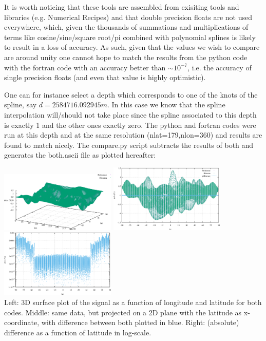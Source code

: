 It is worth noticing that these tools are assembled from exisiting tools and libraries (e.g. 
Numerical Recipes) and that double precision floats are not used everywhere, which, given the
thousands of summations and multiplications of terms like cosine/sine/square root/pi combined
with polynomial splines is likely 
to result in a loss of accuracy. As such, given that the values we wish to compare are around
unity one cannot hope to match the results from the python code with the fortran code with 
an accuracy better than $\sim 10^{-7}$, i.e. the accuracy of single precision floats  (and even 
that value is highly optimistic).

One can for instance select a depth which corresponds to one of the knots of the spline, 
say $d=2584716.092945\si{m}$.
In this case we know that the spline interpolation will/should not take place since the
spline associated to this depth is exactly 1 and the other ones exactly zero. 
The python and fortran codes were run at this depth and at the same resolution (nlat=179,nlon=360)
and results are found to match nicely. The {\filenamefont compare.py} script subtracts the results 
of both and generates the {\filenamefont both.ascii} file as plotted hereafter:
  

\begin{center}
\includegraphics[width=5.5cm]{python_codes/fieldstone_85/compare/both3D.png}
\includegraphics[width=5.5cm]{python_codes/fieldstone_85/compare/both2D.png}
\includegraphics[width=5.5cm]{python_codes/fieldstone_85/compare/both2Dlog.png}\\
{\captionfont Left: 3D surface plot of the signal as a function of longitude and latitude for 
both codes. Middle: same data, but projected on a 2D plane with the latitude as x-coordinate, 
with difference between both plotted in blue. Right: (absolute) difference as a function 
of latitude in log-scale.}
\end{center}

